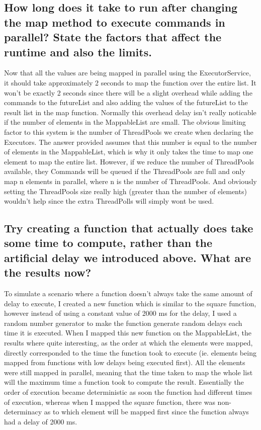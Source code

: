 \documentclass[a4paper]{article}
\theoremstyle{definition}
\begin{document}
\subsection{How long does it take to run after changing the map method to execute commands in parallel? State the factors that affect the runtime and also the limits.}
Now that all the values are being mapped in parallel using the ExecutorService, it should take approximately 2 seconds to map the function over the entire list. It won't be exactly 2 seconds since there will be a slight overhead while adding the commands to the futureList and also adding the values of the futureList to the result list in the map function. Normally this overhead delay isn't really noticable if the number of elements in the MappableList are small. The obvious limiting factor to this system is the number of ThreadPools we create when declaring the Executors. The answer provided assumes that this number is equal to the number of elements in the MappableList, which is why it only takes the time to map one element to map the entire list. However, if we reduce the number of ThreadPools available, they Commands will be queued if the ThreadPools are full and only map n elements in parallel, where n is the number of ThreadPools. And obviously setting the ThreadPools size really high (greater than the number of elements) wouldn't help since the extra ThreadPolls will simply wont be used. 

\subsection{Try creating a function that actually does take some time to compute, rather than the artificial delay we introduced above. What are the results now?}
To simulate a scenario where a function doesn't always take the same amount of delay to execute, I created a new function which is similar to the square function, however instead of using a constant value of 2000 ms for the delay, I used a random number generator to make the function generate random delays each time it is executed. When I mapped this new function on the MappableList, the results where quite interesting, as the order at which the elements were mapped, directly corresponded to the time the function took to execute (ie. elements being mapped from functions with low delays being executed first). All the elements were still mapped in parallel, meaning that the time taken to map the whole list will the maximum time a function took to compute the result. Essentially the order of execution became deterministic as soon the function had different times of execution, whereas when I mapped the square function, there was non-determinacy as to which element will be mapped first since the function always had a delay of 2000 ms.
\end{document}
